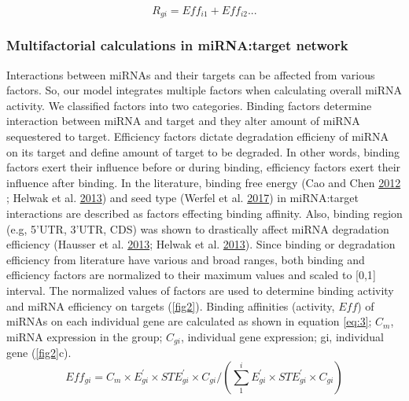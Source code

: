 \documentclass[]{article}
\begin{document}
\begin{equation}
   R_{gi}= Eff_{i1} + Eff_{i2} ... \tag{2}\label{eq:2}
\end{equation}

\hypertarget{multifactorial-calculations-in-mirnatarget-network}{%
\subsubsection{Multifactorial calculations in miRNA:target
network}\label{multifactorial-calculations-in-mirnatarget-network}}

Interactions between miRNAs and their targets can be affected from
various factors. So, our model integrates multiple factors when
calculating overall miRNA activity. We classified factors into two
categories. Binding factors determine interaction between miRNA and
target and they alter amount of miRNA sequestered to target. Efficiency
factors dictate degradation efficieny of miRNA on its target and define
amount of target to be degraded. In other words, binding factors exert
their influence before or during binding, efficiency factors exert their
influence after binding. In the literature, binding free energy (Cao and
Chen \protect\hyperlink{ref-cao_predicting_2012}{2012} ; Helwak et al.
\protect\hyperlink{ref-helwak_mapping_2013}{2013}) and seed type (Werfel
et al. \protect\hyperlink{ref-werfel_preferential_2017}{2017}) in
miRNA:target interactions are described as factors effecting binding
affinity. Also, binding region (e.g, 5'UTR, 3'UTR, CDS) was shown to
drastically affect miRNA degradation efficiency (Hausser et al.
\protect\hyperlink{ref-hausser_analysis_2013}{2013}; Helwak et al.
\protect\hyperlink{ref-helwak_mapping_2013}{2013}). Since binding or
degradation efficiency from literature have various and broad ranges,
both binding and efficiency factors are normalized to their maximum
values and scaled to {[}0,1{]} interval. The normalized values of
factors are used to determine binding activity and miRNA efficiency on
targets (\autoref{fig2}). Binding affinities (activity, \(Eff\)) of
miRNAs on each individual gene are calculated as shown in equation
\eqref{eq:3}; \(C_m\), miRNA expression in the group; \(C_{gi}\),
individual gene expression; gi, individual gene (\autoref{fig2}c).
\begin{equation}
Eff_{gi}= C_m \times E^\prime_{gi} \times STE^\prime_{gi} \times C_{gi}/(\sum_{1}^{i} E^\prime_{gi} \times STE^\prime_{gi} \times C_{gi}) \tag{3}\label{eq:3}
\end{equation}
\end{document}
